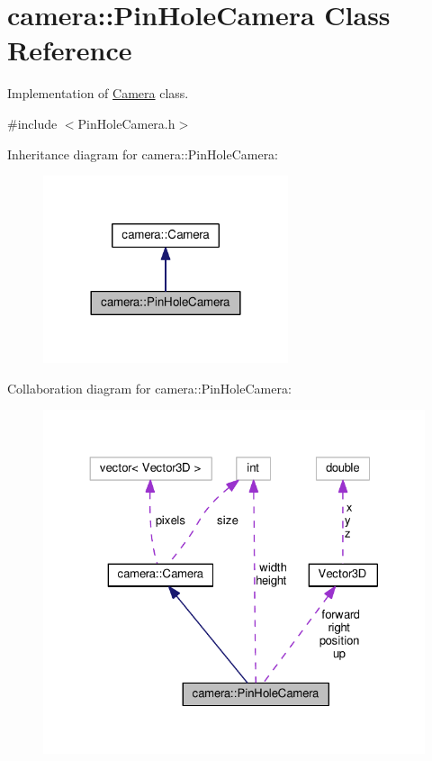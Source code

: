 \hypertarget{classcamera_1_1PinHoleCamera}{}\section{camera\+:\+:Pin\+Hole\+Camera Class Reference}
\label{classcamera_1_1PinHoleCamera}


Implementation of \hyperlink{classcamera_1_1Camera}{Camera} class.  




{\ttfamily \#include $<$Pin\+Hole\+Camera.\+h$>$}



Inheritance diagram for camera\+:\+:Pin\+Hole\+Camera\+:\nopagebreak
\begin{figure}[H]
\begin{center}
\leavevmode
\includegraphics[width=204pt]{classcamera_1_1PinHoleCamera__inherit__graph}
\end{center}
\end{figure}


Collaboration diagram for camera\+:\+:Pin\+Hole\+Camera\+:\nopagebreak
\begin{figure}[H]
\begin{center}
\leavevmode
\includegraphics[width=324pt]{classcamera_1_1PinHoleCamera__coll__graph}
\end{center}
\end{figure}
